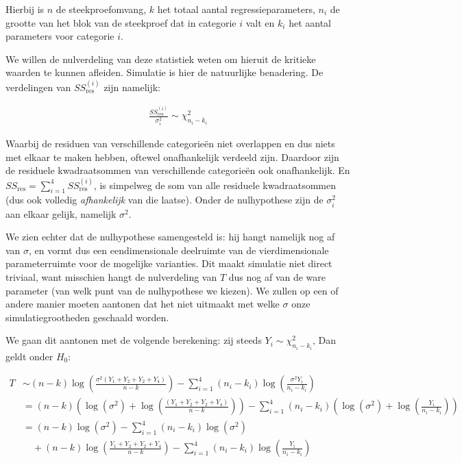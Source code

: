 \documentclass[a4paper]{report}
\begin{document}
  Hierbij is $n$ de steekproefomvang, $k$ het totaal aantal regressieparameters, $n_i$ de grootte van het blok van de steekproef dat in categorie $i$ valt en $k_i$ het aantal parameters voor categorie $i$.
  
  We willen de nulverdeling van deze statistiek weten om hieruit de kritieke waarden te kunnen afleiden. Simulatie is hier de natuurlijke benadering. De verdelingen van $SS_{\text{res}}^{(i)}$ zijn namelijk:
  
  \begin{align*}
  \frac{SS_{\text{res}}^{(i)}}{\sigma_i^2} \sim \chi_{n_i-k_i}^2
  \end{align*}
  
  Waarbij de residuen van verschillende categorie\"en niet overlappen en dus niets met elkaar te maken hebben, oftewel onafhankelijk verdeeld zijn. Daardoor zijn de residuele kwadraatsommen van verschillende categorie\"en ook onafhankelijk. En $SS_{\text{res}} = \sum_{i=1}^4 SS_{\text{res}}^{(i)}$, is simpelweg de som van alle residuele kwadraatsommen (dus ook volledig \emph{afhankelijk} van die laatse). Onder de nulhypothese zijn de $\sigma_i^2$ aan elkaar gelijk, namelijk $\sigma^2$.
  
  We zien echter dat de nulhypothese samengesteld is: hij hangt namelijk nog af van $\sigma$, en vormt dus een eendimensionale deelruimte van de vierdimensionale parameterruimte voor de mogelijke varianties. Dit maakt simulatie niet direct triviaal, want misschien hangt de nulverdeling van $T$ dus nog af van de ware parameter (van welk punt van de nulhypothese we kiezen). We zullen op een of andere manier moeten aantonen dat het niet uitmaakt met welke $\sigma$ onze simulatiegrootheden geschaald worden.
  
  We gaan dit aantonen met de volgende berekening: zij steeds $Y_i \sim \chi_{n_i-k_i}^2$, Dan geldt onder $H_0$:
  
  \begin{align*}
    T &\sim (n-k)\log\left(\frac{\sigma^2(Y_1+Y_2+Y_2+Y_4)}{n-k}\right) - \sum_{i=1}^4 (n_i-k_i)\log\left(\frac{\sigma^2Y_i}{n_i-k_i}\right) \\
    &= (n-k)(\log(\sigma^2) +\log\left(\frac{(Y_1+Y_2+Y_2+Y_4)}{n-k}\right) ) - \sum_{i=1}^4 (n_i-k_i)(\log(\sigma^2)+\log\left(\frac{Y_i}{n_i-k_i}\right) ) \\
    &= (n-k)\log(\sigma^2) - \sum_{i=1}^4 (n_i-k_i)\log(\sigma^2) \\
     &\quad + (n-k)\log\left(\frac{Y_1+Y_2+Y_2+Y_4}{n-k}\right) - \sum_{i=1}^4 (n_i-k_i)\log\left(\frac{Y_i}{n_i-k_i}\right) \\
  \end{align*}
  
\end{document}
